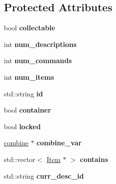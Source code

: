 \subsection*{\-Protected \-Attributes}
\begin{DoxyCompactItemize}
\item 
\hypertarget{class_item_a6bdb6d40e682e1cac093a786cb51d1d1}{
bool {\bfseries collectable}}
\label{class_item_a6bdb6d40e682e1cac093a786cb51d1d1}

\item 
\hypertarget{class_item_a0bedf3dd3801688ca197958b4ed82cd7}{
int {\bfseries num\-\_\-descriptions}}
\label{class_item_a0bedf3dd3801688ca197958b4ed82cd7}

\item 
\hypertarget{class_item_ac9e4624443be051800792a7f37014373}{
int {\bfseries num\-\_\-commands}}
\label{class_item_ac9e4624443be051800792a7f37014373}

\item 
\hypertarget{class_item_ab09c4bcd4d8d1d4626c38e230610df42}{
int {\bfseries num\-\_\-items}}
\label{class_item_ab09c4bcd4d8d1d4626c38e230610df42}

\item 
\hypertarget{class_item_a1c8acc0ec062f69ccc65faf2a3a44bdb}{
std\-::string {\bfseries id}}
\label{class_item_a1c8acc0ec062f69ccc65faf2a3a44bdb}

\item 
\hypertarget{class_item_a7f22375d075c99d1ecfc3f535f74d43f}{
bool {\bfseries container}}
\label{class_item_a7f22375d075c99d1ecfc3f535f74d43f}

\item 
\hypertarget{class_item_ad83d99679394b23a06681d21eacd312e}{
bool {\bfseries locked}}
\label{class_item_ad83d99679394b23a06681d21eacd312e}

\item 
\hypertarget{class_item_a7dc399a5ff88b8f2f9bfef1871dfd0a0}{
\hyperlink{classcombine}{combine} $\ast$ {\bfseries combine\-\_\-var}}
\label{class_item_a7dc399a5ff88b8f2f9bfef1871dfd0a0}

\item 
\hypertarget{class_item_a226a0752ee3d4218d44f6de2f787a3c9}{
std\-::vector$<$ \hyperlink{class_item}{\-Item} $\ast$ $>$ {\bfseries contains}}
\label{class_item_a226a0752ee3d4218d44f6de2f787a3c9}

\item 
\hypertarget{class_item_a3c36a19c6fae89b169cc1acf555532dd}{
std\-::string {\bfseries curr\-\_\-desc\-\_\-id}}
\label{class_item_a3c36a19c6fae89b169cc1acf555532dd}


\end{DoxyCompactItemize}
